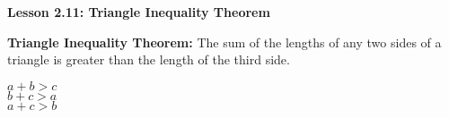  \begin{center}
\textbf{Lesson 2.11: Triangle Inequality Theorem}
\end{center}


\textbf{Triangle Inequality Theorem:} The sum of the lengths of any two sides of a triangle is greater than the length of the third side.

\begin{center}
\begin{minipage}[c]{0.48\textwidth}
\begin{flushright}
\hspace*{1em}
\end{flushright}
\end{minipage}
\begin{minipage}[c]{0.48\textwidth}
$ a + b > c $\\
$ b + c > a $\\
$ a + c > b $\\
\end{minipage}
\end{center}
